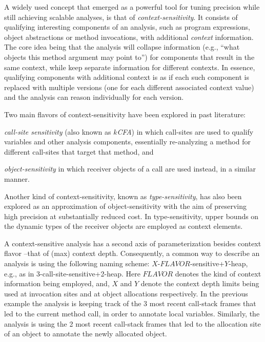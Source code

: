A widely used concept that emerged as a powerful tool for tuning precision
while still achieving scalable analyses, is that of \emph{context-sensitivity}.
It consists of qualifying interesting components of an analysis, such as
program expressions, object abstractions or method invocations, with additional
\emph{context} information. The core idea being that the analysis will collapse
information (e.g., ``what objects this method argument may point to'') for
components that result in the same context, while keep separate information for
different contexts. In essence, qualifying components with additional context
is as if each such component is replaced with multiple versions (one for each
different associated context value) and the analysis can reason individually
for each version.

Two main flavors of context-sensitivity have been explored in past literature:
\begin{inparaenum}[(1)]
\item \emph{call-site sensitivity} (also known as \emph{$k$CFA}) in which
	call-sites are used to qualify variables and other analysis components,
	essentially re-analyzing a method for different call-sites that target that
	method, and
\item \emph{object-sensitivity} in which receiver objects of a call are used
	instead, in a similar manner.
\end{inparaenum}
Another kind of context-sensitivity, known as \emph{type-sensitivity}, has also
been explored as an approximation of object-sensitivity with the aim of
preserving high precision at substantially reduced cost. In type-sensitivity,
upper bounds on the dynamic types of the receiver objects are employed as
context elements. 

A context-sensitive analysis has a second axis of parameterization besides
context flavor --that of (max) context depth. Consequently, a common way to
describe an analysis is using the following naming scheme:
$X$-$FLAVOR$-sensitive+$Y$-heap, e.g., as in 3-call-site-sensitive+2-heap. Here
$FLAVOR$ denotes the kind of context information being employed, and, $X$ and
$Y$ denote the context depth limits being used at invocation sites and at
object allocations respectively. In the previous example the analysis is
keeping track of the 3 most recent call-stack frames that led to the current
method call, in order to annotate local variables. Similarly, the analysis is
using the 2 most recent call-stack frames that led to the allocation site of an
object to annotate the newly allocated object.


